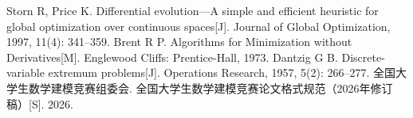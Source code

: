 \begin{thebibliography}{9}
     Storn R, Price K.
    \newblock Differential evolution---A simple and efficient heuristic for global optimization over continuous spaces[J].
    \newblock Journal of Global Optimization, 1997, 11(4): 341--359.
     Brent R P.
    \newblock Algorithms for Minimization without Derivatives[M].
    \newblock Englewood Cliffs: Prentice-Hall, 1973.
     Dantzig G B.
    \newblock Discrete-variable extremum problems[J].
    \newblock Operations Research, 1957, 5(2): 266--277.
     全国大学生数学建模竞赛组委会.
    \newblock 全国大学生数学建模竞赛论文格式规范（2026年修订稿）[S]. 2026.
\end{thebibliography}
\endinput
\begin{thebibliography}{9}
    \bibitem[1]{liuhaiyang2013latex} 刘海洋.
    \newblock \LaTeX {}入门\allowbreak[J].
    \newblock 电子工业出版社, 北京, 2013.
    \bibitem[2]{mathematical-modeling} 全国大学生数学建模竞赛论文格式规范 (2026 年 修改).
\end{thebibliography}
